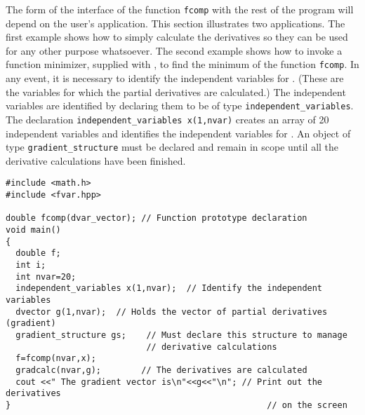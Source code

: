 \documentclass{admbmanual}
\begin{document}
The form of the interface of the function \texttt{fcomp} with the rest of the
program will depend on the user's application. This section illustrates two
applications. The first example shows how to simply calculate the derivatives so
they can be used for any other purpose whatsoever. The second example shows how
to invoke a function minimizer, supplied with \scAD, to find the minimum of the
function \texttt{fcomp}. In any event, it is necessary to identify the
independent variables for \scAD. (These are the variables for which the partial
derivatives are calculated.) The independent variables are identified by
declaring them to be of type \texttt{independent\_variables}.
The declaration \texttt{independent\_variables x(1,nvar)} creates an array of 20
independent variables and identifies the independent variables for \scAD. An
object of type \texttt{gradient\_structure} must be declared and remain in scope
until all the derivative calculations have been finished.
\begin{lstlisting}
#include <math.h>
#include <fvar.hpp>

double fcomp(dvar_vector); // Function prototype declaration
void main()
{
  double f;
  int i;
  int nvar=20;
  independent_variables x(1,nvar);  // Identify the independent variables
  dvector g(1,nvar);  // Holds the vector of partial derivatives (gradient)
  gradient_structure gs;    // Must declare this structure to manage
                            // derivative calculations
  f=fcomp(nvar,x);
  gradcalc(nvar,g);        // The derivatives are calculated
  cout <<" The gradient vector is\n"<<g<<"\n"; // Print out the derivatives
}                                                   // on the screen
\end{lstlisting}

\end{document}
